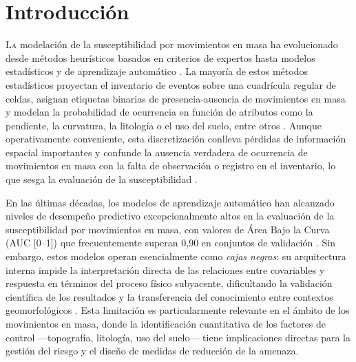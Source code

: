 \documentclass[10pt, twocolumn, letterpaper]{article}
\begin{document}
\section{Introducción}
\label{sec:intro}

\lettrine[lines=2]{L}{a} modelación de la susceptibilidad por movimientos en
masa ha evolucionado desde métodos heurísticos basados en criterios de expertos
hasta modelos estadísticos y de aprendizaje automático \cite{reichenbach2018}. La mayoría de
estos métodos estadísticos proyectan el inventario de eventos sobre una
cuadrícula regular de celdas, asignan etiquetas binarias de presencia-ausencia
de movimientos en masa y modelan la probabilidad de ocurrencia en función de
atributos como la pendiente, la curvatura, la litología o el uso del suelo,
entre otros \cite{guzzetti2005, lombardo2018}. Aunque operativamente
conveniente, esta discretización conlleva pérdidas de información espacial
importantes y confunde la ausencia verdadera de ocurrencia de movimientos en
masa con la falta de observación o registro en el inventario, lo que sesga la
evaluación de la susceptibilidad \cite{lombardo2018}.

En las últimas décadas, los modelos de aprendizaje automático han alcanzado niveles de desempeño predictivo
excepcionalmente altos en la evaluación de la susceptibilidad por movimientos en
masa, con valores de Área Bajo la Curva (AUC [0--1]) que frecuentemente superan
0,90 en conjuntos de validación \cite{reichenbach2018}. Sin embargo, estos
modelos operan esencialmente como \emph{cajas negras}: su arquitectura interna
impide la interpretación directa de las relaciones entre covariables y respuesta
en términos del proceso físico subyacente, dificultando la validación científica
de los resultados y la transferencia del conocimiento entre contextos
geomorfológicos \cite{lombardo2018}. Esta limitación es particularmente
relevante en el ámbito de los movimientos en masa, donde la identificación
cuantitativa de los factores de control ---topografía, litología, uso del
suelo--- tiene implicaciones directas para la gestión del riesgo y el diseño de
medidas de reducción de la amenaza.
\end{document}
